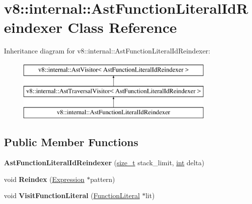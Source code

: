 \hypertarget{classv8_1_1internal_1_1AstFunctionLiteralIdReindexer}{}\section{v8\+:\+:internal\+:\+:Ast\+Function\+Literal\+Id\+Reindexer Class Reference}
\label{classv8_1_1internal_1_1AstFunctionLiteralIdReindexer}
Inheritance diagram for v8\+:\+:internal\+:\+:Ast\+Function\+Literal\+Id\+Reindexer\+:\begin{figure}[H]
\begin{center}
\leavevmode
\includegraphics[height=3.000000cm]{classv8_1_1internal_1_1AstFunctionLiteralIdReindexer}
\end{center}
\end{figure}
\subsection*{Public Member Functions}
\begin{DoxyCompactItemize}
\item 
\mbox{\label{classv8_1_1internal_1_1AstFunctionLiteralIdReindexer_a8e68785ab7ea8948466b52f5419e83ae}} 
{\bfseries Ast\+Function\+Literal\+Id\+Reindexer} (\mbox{\hyperlink{classsize__t}{size\+\_\+t}} stack\+\_\+limit, \mbox{\hyperlink{classint}{int}} delta)
\item 
\mbox{\label{classv8_1_1internal_1_1AstFunctionLiteralIdReindexer_a2ff3e553f55800ee72fcdbbc074a268d}} 
void {\bfseries Reindex} (\mbox{\hyperlink{classv8_1_1internal_1_1Expression}{Expression}} $\ast$pattern)
\item 
\mbox{\label{classv8_1_1internal_1_1AstFunctionLiteralIdReindexer_ad88389f7a030c04d82367407744871d6}} 
void {\bfseries Visit\+Function\+Literal} (\mbox{\hyperlink{classv8_1_1internal_1_1FunctionLiteral}{Function\+Literal}} $\ast$lit)
\end{DoxyCompactItemize}
